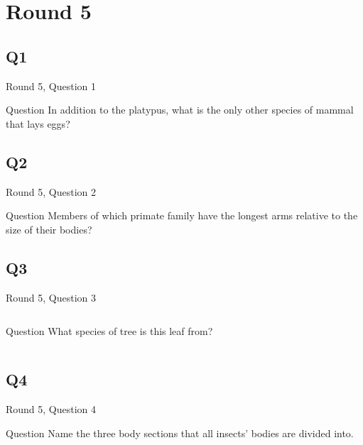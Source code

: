 \documentclass[11pt]{beamer}
\begin{document}
\def\thisSectionName{Plants and Animals}
\section{Round 5}
    

\subsection*{Q1}
\begin{frame}[t]{Round 5, Question 1}
\vspace{0.5em}
\begin{block}{Question}
In addition to the platypus, what is the only other species of mammal that lays eggs?
\end{block}
\end{frame}
    

\subsection*{Q2}
\begin{frame}[t]{Round 5, Question 2}
\vspace{0.5em}
\begin{block}{Question}
Members of which primate family have the longest arms relative to the size of their bodies?
\end{block}
\end{frame}
    

\subsection*{Q3}
\begin{frame}[t]{Round 5, Question 3}
\vspace{0.5em}
\begin{columns}[T,totalwidth=\linewidth]
\begin{column}{0.25\linewidth}
\begin{block}{Question}
What species of tree is this leaf from?
\end{block}
\end{column}
\begin{column}{0.7\linewidth}
\begin{center}
\texttt{[image: \{Images/gingko]}.jpg}
\end{center}
\end{column}
\end{columns}
\end{frame}
    

\subsection*{Q4}
\begin{frame}[t]{Round 5, Question 4}
\vspace{0.5em}
\begin{block}{Question}
Name the three body sections that all insects' bodies are divided into.
\end{block}
\end{frame}
    
\end{document}
